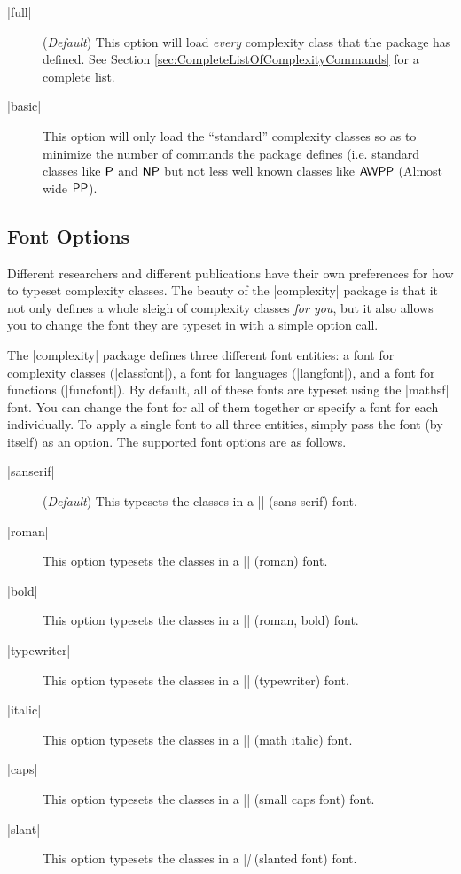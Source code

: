 \documentclass{ltxdoc}
\begin{document}
\begin{description}

  \item[|full|] (\emph{Default}) This option will load \emph{every} complexity class
  that the package has defined.  See Section
  \ref{sec:CompleteListOfComplexityCommands} for a complete list.

  \item[|basic|]  This option will only load the
  ``standard'' complexity classes so as to minimize the number of
  commands the package defines (i.e. standard classes like $\P$ and
  $\NP$ but not less well known classes like $\AWPP$ (Almost wide $\PP$).

\end{description}

\subsection{Font Options}

Different researchers and different publications have their own
preferences for how to typeset complexity classes.  The beauty of
the |complexity| package is that it not only defines a whole sleigh
of complexity classes \emph{for you}, but it also allows you to
change the font they are typeset in with a simple option call.

The |complexity| package defines three different font entities: a
font for complexity classes (|classfont|), a font for languages
(|langfont|), and a font for functions (|funcfont|).  By default,
all of these fonts are typeset using the |mathsf| font.  You can
change the font for all of them together or specify a font for each
individually.  To apply a single font to all three entities, simply
pass the font (by itself) as an option.  The supported font options
are as follows.

\begin{description}

  \item[|sanserif|]  (\emph{Default}) This typesets the classes in a
  |\mathsf| (sans serif) font.

  \item[|roman|]  This option typesets the classes in a |\mathrm| (roman)
  font.

  \item[|bold|]   This option typesets the classes in a |\mathbf|
  (roman, bold) font.

  \item[|typewriter|]   This option typesets the classes in a |\mathtt|
  (typewriter) font.

  \item[|italic|]   This option typesets the classes in a |\mathit|
  (math italic) font.

  \item[|caps|]   This option typesets the classes in a |\textsc|
  (small caps font) font.

  \item[|slant|]   This option typesets the classes in a |\textsl|
  (slanted font) font.

\end{description}
\end{document}
